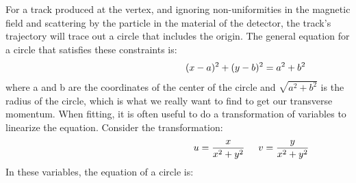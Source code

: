 For a track produced at the vertex, and ignoring non-uniformities in the magnetic field and scattering by the particle in the material of the detector, the track's trajectory will trace out a circle that includes the origin.  The general equation for a circle that satisfies these constraints is:
\begin{equation}\hspace{50 mm}
(x-a)^{2}+(y-b)^{2}=a^{2}+b^{2}
\end{equation}
where a and b are the coordinates of the center of the circle and $\sqrt{a^{2}+b^{2}}$ is the radius of the circle, which is what we really want to find to get our transverse momentum.
When fitting, it is often useful to do a transformation of variables to linearize the equation.  Consider the transformation:
\begin{equation}\hspace {54mm}
u=\frac{x}{x^{2}+y^{2}} \hspace{5 mm} v=\frac{y}{x^{2}+y^{2}}
\end{equation}
\noindent
In these variables, the equation of a circle is:
